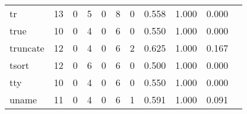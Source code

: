 \begin{longtable}{lp{1.2cm}p{1.2cm}p{1.2cm}p{1.2cm}p{1.2cm}p{1.2cm}p{1.2cm}p{1.2cm}p{1.2cm}p{1.2cm}}
tr        &                                    13 &                                                  0 &                                                  5 &                                                  0 &                                                  8 &                                                  0 &                                              0.558 &                                              1.000 &                                              0.000 \\
true      &                                    10 &                                                  0 &                                                  4 &                                                  0 &                                                  6 &                                                  0 &                                              0.550 &                                              1.000 &                                              0.000 \\
truncate  &                                    12 &                                                  0 &                                                  4 &                                                  0 &                                                  6 &                                                  2 &                                              0.625 &                                              1.000 &                                              0.167 \\
tsort     &                                    12 &                                                  0 &                                                  6 &                                                  0 &                                                  6 &                                                  0 &                                              0.500 &                                              1.000 &                                              0.000 \\
tty       &                                    10 &                                                  0 &                                                  4 &                                                  0 &                                                  6 &                                                  0 &                                              0.550 &                                              1.000 &                                              0.000 \\
uname     &                                    11 &                                                  0 &                                                  4 &                                                  0 &                                                  6 &                                                  1 &                                              0.591 &                                              1.000 &                                              0.091 \\

\end{longtable}
